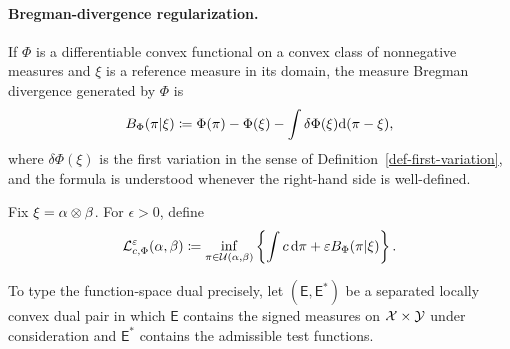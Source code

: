 \paragraph{Bregman-divergence regularization.}
\begin{defn}\label{def-measure-bregman-divergence}
If $\Phi$ is a differentiable convex functional on a convex class of nonnegative measures and $\xi$ is a reference measure in its domain, the measure Bregman divergence generated by $\Phi$ is
\begin{equation}\label{eq-measure-bregman-divergence}
B_\Phi(\pi|\xi)
\coloneqq
\Phi(\pi)-\Phi(\xi)
-
\int \delta\Phi(\xi)\mathrm{d}(\pi-\xi),
\end{equation}
where $\delta\Phi(\xi)$ is the first variation in the sense of Definition~\ref{def-first-variation}, and the formula is understood whenever the right-hand side is well-defined.
\end{defn}
\begin{defn}\label{def-bregman-regularized-ot}
Fix $\xi=\alpha\otimes\beta$. For $\epsilon>0$, define
\[
\mathcal{L}_{c,\Phi}^{\varepsilon}(\alpha,\beta)
\coloneqq
\inf_{\pi\in\mathcal{U}(\alpha,\beta)}
\left\{\int c\,\mathrm{d}\pi+\varepsilon B_\Phi(\pi|\xi)\right\}.
\]
\end{defn}
To type the function-space dual precisely, let $(\mathsf E,\mathsf E^*)$ be a separated locally convex dual pair in which $\mathsf E$ contains the signed measures on $\mathcal{X}\times\mathcal{Y}$ under consideration and $\mathsf E^*$ contains the admissible test functions.


